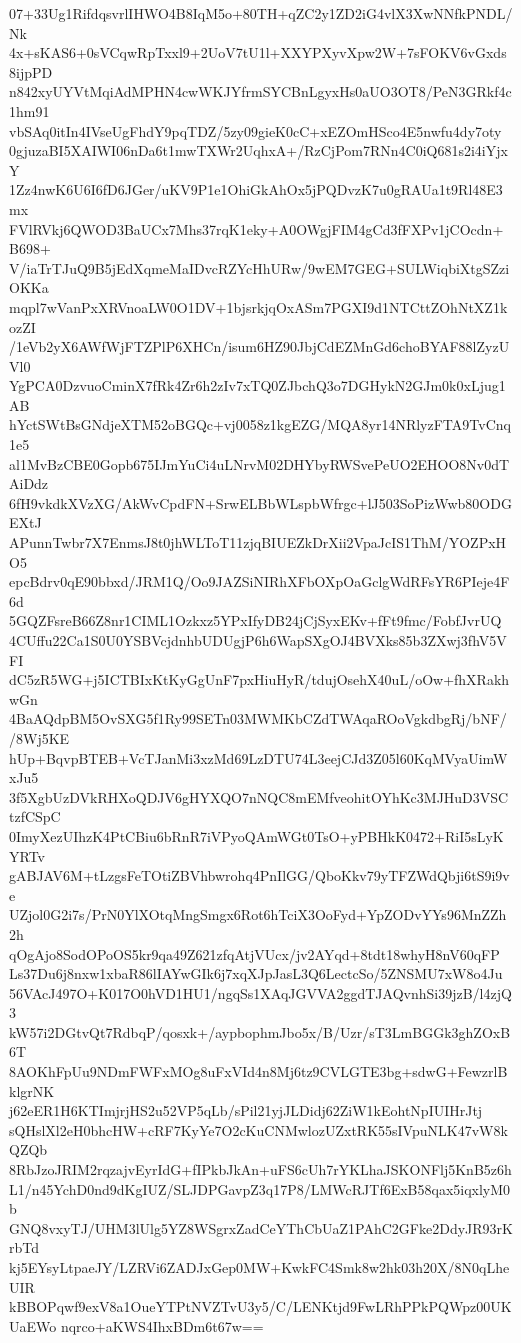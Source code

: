 07+33Ug1RifdqsvrlIHWO4B8IqM5o+80TH+qZC2y1ZD2iG4vlX3XwNNfkPNDL/Nk
4x+sKAS6+0sVCqwRpTxxl9+2UoV7tU1l+XXYPXyvXpw2W+7sFOKV6vGxds8ijpPD
n842xyUYVtMqiAdMPHN4cwWKJYfrmSYCBnLgyxHs0aUO3OT8/PeN3GRkf4c1hm91
vbSAq0itIn4IVseUgFhdY9pqTDZ/5zy09gieK0cC+xEZOmHSco4E5nwfu4dy7oty
0gjuzaBI5XAIWI06nDa6t1mwTXWr2UqhxA+/RzCjPom7RNn4C0iQ681s2i4iYjxY
1Zz4nwK6U6I6fD6JGer/uKV9P1e1OhiGkAhOx5jPQDvzK7u0gRAUa1t9Rl48E3mx
FVlRVkj6QWOD3BaUCx7Mhs37rqK1eky+A0OWgjFIM4gCd3fFXPv1jCOcdn+B698+
V/iaTrTJuQ9B5jEdXqmeMaIDvcRZYcHhURw/9wEM7GEG+SULWiqbiXtgSZziOKKa
mqpl7wVanPxXRVnoaLW0O1DV+1bjsrkjqOxASm7PGXI9d1NTCttZOhNtXZ1kozZI
/1eVb2yX6AWfWjFTZPlP6XHCn/isum6HZ90JbjCdEZMnGd6choBYAF88lZyzUVl0
YgPCA0DzvuoCminX7fRk4Zr6h2zIv7xTQ0ZJbchQ3o7DGHykN2GJm0k0xLjug1AB
hYctSWtBsGNdjeXTM52oBGQc+vj0058z1kgEZG/MQA8yr14NRlyzFTA9TvCnq1e5
al1MvBzCBE0Gopb675IJmYuCi4uLNrvM02DHYbyRWSvePeUO2EHOO8Nv0dTAiDdz
6fH9vkdkXVzXG/AkWvCpdFN+SrwELBbWLspbWfrgc+lJ503SoPizWwb80ODGEXtJ
APunnTwbr7X7EnmsJ8t0jhWLToT11zjqBIUEZkDrXii2VpaJcIS1ThM/YOZPxHO5
epcBdrv0qE90bbxd/JRM1Q/Oo9JAZSiNIRhXFbOXpOaGclgWdRFsYR6PIeje4F6d
5GQZFsreB66Z8nr1CIML1Ozkxz5YPxIfyDB24jCjSyxEKv+fFt9fmc/FobfJvrUQ
4CUffu22Ca1S0U0YSBVcjdnhbUDUgjP6h6WapSXgOJ4BVXks85b3ZXwj3fhV5VFI
dC5zR5WG+j5ICTBIxKtKyGgUnF7pxHiuHyR/tdujOsehX40uL/oOw+fhXRakhwGn
4BaAQdpBM5OvSXG5f1Ry99SETn03MWMKbCZdTWAqaROoVgkdbgRj/bNF//8Wj5KE
hUp+BqvpBTEB+VcTJanMi3xzMd69LzDTU74L3eejCJd3Z05l60KqMVyaUimWxJu5
3f5XgbUzDVkRHXoQDJV6gHYXQO7nNQC8mEMfveohitOYhKc3MJHuD3VSCtzfCSpC
0ImyXezUIhzK4PtCBiu6bRnR7iVPyoQAmWGt0TsO+yPBHkK0472+RiI5sLyKYRTv
gABJAV6M+tLzgsFeTOtiZBVhbwrohq4PnIlGG/QboKkv79yTFZWdQbji6tS9i9ve
UZjol0G2i7s/PrN0YlXOtqMngSmgx6Rot6hTciX3OoFyd+YpZODvYYs96MnZZh2h
qOgAjo8SodOPoOS5kr9qa49Z621zfqAtjVUcx/jv2AYqd+8tdt18whyH8nV60qFP
Ls37Du6j8nxw1xbaR86lIAYwGIk6j7xqXJpJasL3Q6LectcSo/5ZNSMU7xW8o4Ju
56VAcJ497O+K017O0hVD1HU1/ngqSs1XAqJGVVA2ggdTJAQvnhSi39jzB/l4zjQ3
kW57i2DGtvQt7RdbqP/qosxk+/aypbophmJbo5x/B/Uzr/sT3LmBGGk3ghZOxB6T
8AOKhFpUu9NDmFWFxMOg8uFxVId4n8Mj6tz9CVLGTE3bg+sdwG+FewzrlBklgrNK
j62eER1H6KTImjrjHS2u52VP5qLb/sPil21yjJLDidj62ZiW1kEohtNpIUIHrJtj
sQHslXl2eH0bhcHW+cRF7KyYe7O2cKuCNMwlozUZxtRK55sIVpuNLK47vW8kQZQb
8RbJzoJRIM2rqzajvEyrIdG+fIPkbJkAn+uFS6cUh7rYKLhaJSKONFlj5KnB5z6h
L1/n45YchD0nd9dKgIUZ/SLJDPGavpZ3q17P8/LMWcRJTf6ExB58qax5iqxlyM0b
GNQ8vxyTJ/UHM3lUlg5YZ8WSgrxZadCeYThCbUaZ1PAhC2GFke2DdyJR93rKrbTd
kj5EYsyLtpaeJY/LZRVi6ZADJxGep0MW+KwkFC4Smk8w2hk03h20X/8N0qLheUIR
kBBOPqwf9exV8a1OueYTPtNVZTvU3y5/C/LENKtjd9FwLRhPPkPQWpz00UKUaEWo
nqrco+aKWS4IhxBDm6t67w==
